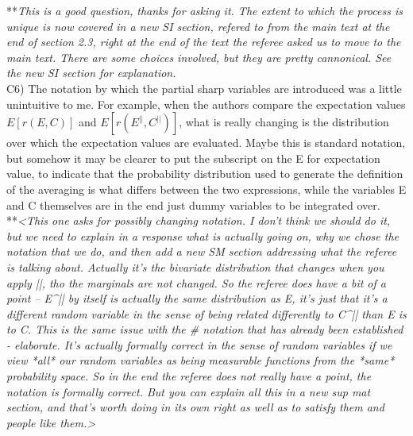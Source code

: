 \documentclass[letterpaper,11pt]{article}
\begin{document}
\noindent ***\emph{This is a good question, thanks for asking it. The extent to which the process is 
unique is now covered in a new SI section, refered to from the main text at the end of section 2.3, 
right at the end of the text the referee asked us to move to the main text. There are some choices involved,
but they are pretty cannonical. See the new SI section for explanation. } \\

\noindent C6) The notation by which the partial sharp variables are introduced was a little unintuitive to me.  For example, when the authors compare the expectation values 
$E[r(E,C)]$ and $E[r(E^{||},C^{||})]$, what is really changing is the distribution over which the expectation values are evaluated.  Maybe this is standard notation, but somehow it may be clearer to put the subscript on the E for expectation value, to indicate that the probability distribution used to generate the definition of the averaging is what differs between the two expressions, while the variables E and C themselves are in the end just dummy variables to be integrated over.  \\

\noindent ***\emph{<This one asks for possibly changing notation. I don’t think we should do it, but we need to explain in a response what is actually going on, why we chose the notation that we do, and then add a new SM section addressing what the referee is talking about. Actually it’s the bivariate distribution that changes when you apply ||, tho the marginals are not changed. So the referee does have a bit of a point – E^{||} by itself is actually the same distribution as E, it’s just that it’s a different random variable in the sense of being related differently to C^{||} than E is to C. This is the same issue with the # notation that has already been established - elaborate. It’s actually formally correct in the sense of random variables if we view *all* our random variables as being measurable functions from the *same* probability space. So in the end the referee does not really have a point, the notation is formally correct. But you can explain all this in a new sup mat section, and that's worth doing in its own right as well as to satisfy them and people like them.>} \\
\end{document}

